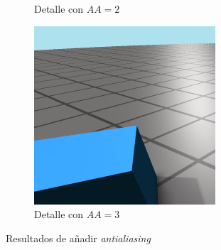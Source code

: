 \begin{figure}[htbp]
\begin{subfigure}[b]{0.3\textwidth}
        \caption{Detalle con $AA = 2$}
    \end{subfigure}
    \hfill
    \begin{subfigure}[b]{0.3\textwidth}
        \centering
        \includegraphics[width=\textwidth]{Plantilla-TFG-master/img/aa3_zoom.png}
        \caption{Detalle con $AA = 3$}
    \end{subfigure}
    \caption{Resultados de añadir \textit{antialiasing}}
    \label{fig:resAA}
\end{figure}


